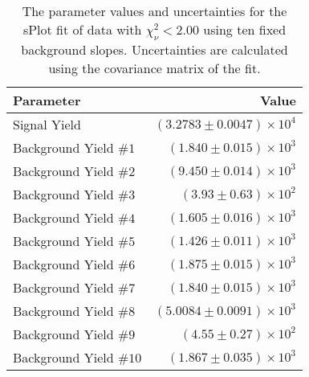 
\begin{table}[ht]
    \begin{center}
        \begin{tabular}{lr}\toprule
            Parameter & Value \\\midrule
            Signal Yield & $(3.2783 \pm 0.0047) \times 10^{4}$ \\
            Background Yield $\#1$ & $(1.840 \pm 0.015) \times 10^{3}$ \\
            Background Yield $\#2$ & $(9.450 \pm 0.014) \times 10^{3}$ \\
            Background Yield $\#3$ & $(3.93 \pm 0.63) \times 10^{2}$ \\
            Background Yield $\#4$ & $(1.605 \pm 0.016) \times 10^{3}$ \\
            Background Yield $\#5$ & $(1.426 \pm 0.011) \times 10^{3}$ \\
            Background Yield $\#6$ & $(1.875 \pm 0.015) \times 10^{3}$ \\
            Background Yield $\#7$ & $(1.840 \pm 0.015) \times 10^{3}$ \\
            Background Yield $\#8$ & $(5.0084 \pm 0.0091) \times 10^{3}$ \\
            Background Yield $\#9$ & $(4.55 \pm 0.27) \times 10^{2}$ \\
            Background Yield $\#10$ & $(1.867 \pm 0.035) \times 10^{3}$ \\\bottomrule
        \end{tabular}
        \caption{The parameter values and uncertainties for the sPlot fit of data with $\chi^2_\nu < 2.00$ using ten fixed background slopes. Uncertainties are calculated using the covariance matrix of the fit.}\label{tab:splot-fit-results-chisqdof-2.00-fixed-10}
    \end{center}
\end{table}
